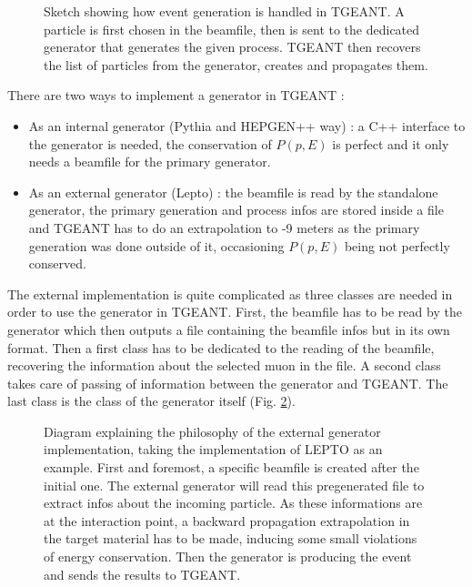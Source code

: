 \begin{figure}[!htb]
\centerline{}
\caption{Sketch showing how event generation is handled in TGEANT. A particle is first chosen in
the beamfile, then is sent to the dedicated generator that generates the given process. TGEANT then
recovers the list of particles from the generator, creates and propagates them.}\label{fig:evtgenTG}
\end{figure}
\newpage
There are two ways to implement a generator in TGEANT :
\begin{itemize}
\item As an internal generator (Pythia and HEPGEN++ way) : a C++ interface to the
generator is needed, the conservation of $P(p,E)$ is perfect and it only needs a
beamfile for the primary generator.
\item As an external generator (Lepto) : the beamfile is read by the standalone
generator, the primary generation and process infos are stored inside a file and
TGEANT has to do an extrapolation to -9 meters as the primary generation was done
outside of it, occasioning $P(p,E)$ being not perfectly conserved.
\end{itemize}

The external implementation is quite complicated as three classes are needed in order
to use the generator in TGEANT. First, the beamfile has to be read by the generator
which then outputs a file containing the beamfile infos but in its own format.
Then a first class has to be dedicated to the reading of the beamfile, recovering
the information about the selected muon in the file. A second class takes care of
passing of information between the generator and TGEANT. The last class is the
class of the generator itself (Fig. \ref{fig:leptoex}).

\begin{figure}[!htb]
\centerline{}
\caption{Diagram explaining the philosophy of the external generator implementation, taking the
implementation of LEPTO as an example. First and foremost, a specific beamfile is created after the
initial one. The external generator will read this pregenerated file to extract infos about the incoming
particle. As these informations are at the interaction point, a backward propagation extrapolation in the
target material has to be made, inducing some small violations of energy conservation.
Then the generator is producing the event and sends the results to TGEANT.}\label{fig:leptoex}
\end{figure}

